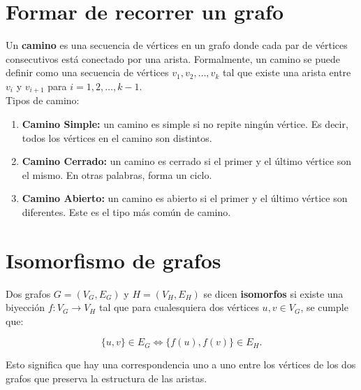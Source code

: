 \documentclass{article}
\begin{document}
\begin{center}
\end{center}

\section{Formar de recorrer un grafo}
Un \textbf{camino} es una secuencia de vértices en un grafo donde cada par de vértices consecutivos está conectado por una arista. Formalmente, un camino se puede definir como una secuencia de vértices $ v_1, v_2, \ldots, v_k $ tal que existe una arista entre $ v_i $ y $ v_{i+1} $ para $ i = 1, 2, \ldots, k-1 $. \\

Tipos de camino:
\begin{enumerate}
    \item \textbf{Camino Simple:} un camino es simple si no repite ningún vértice. Es decir, todos los vértices en el camino son distintos.

    \item \textbf{Camino Cerrado:} un camino es cerrado si el primer y el último vértice son el mismo. En otras palabras, forma un ciclo.

    \item \textbf{Camino Abierto:} un camino es abierto si el primer y el último vértice son diferentes. Este es el tipo más común de camino.
\end{enumerate}

\section{Isomorfismo de grafos}
Dos grafos $ G = (V_G, E_G) $ y $ H = (V_H, E_H) $ se dicen \textbf{isomorfos} si existe una biyección $ f: V_G \to V_H $ tal que para cualesquiera dos vértices $ u, v \in V_G $, se cumple que:

$$\{u, v\} \in E_G \iff \{f(u), f(v)\} \in E_H.$$

Esto significa que hay una correspondencia uno a uno entre los vértices de los dos grafos que preserva la estructura de las aristas. \\
\end{document}
